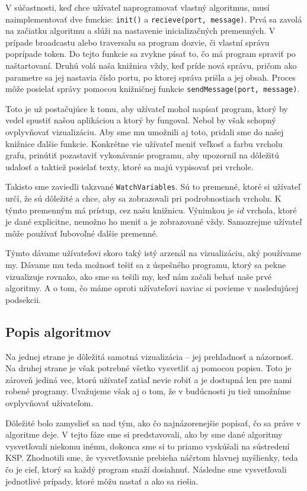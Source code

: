 V súčastnosti, keď chce užívateľ naprogramovať vlastný algoritmus, musí naimplementovať dve funckie: \verb!init()! a
\verb!recieve(port, message)!. Prvá sa zavolá na začiatku algoritmu a slúži na nastavenie
inicializačných premenných. V prípade broadcastu alebo traversalu sa program dozvie, či vlastní správu poprípade token.
Do tejto funkcie sa zvykne písať to, čo má program spraviť po naštartovaní.
Druhú volá naša knižnica vždy, keď príde nová správu, pričom ako parametre sa jej nastavia číslo
portu, po ktorej správa prišla a jej obsah. Proces môže posielať správy pomocou knižničnej
funkcie \verb!sendMessage(port, message)!.

Toto je už postačujúce k tomu, aby užívateľ mohol napísať program, ktorý by vedel spustiť našou
aplikáciou a ktorý by fungoval. Nebol by však schopný ovplyvňovať vizualizáciu. Aby sme mu umožnili
aj toto, pridali sme do našej knižnice ďalšie funkcie. Konkrétne vie užívateľ meniť veľkosť a farbu
vrcholu grafu, prinútiť pozastaviť vykonávanie programu, aby upozornil na dôležitú udalosť a
taktiež posielať texty, ktoré sa majú vypisovať pri vrchole.

Takisto sme zaviedli takzvané \verb!WatchVariables!. Sú to premenné, ktoré si užívateľ určí, že sú
dôležité a chce, aby sa zobrazovali pri podrobnostiach vrcholu. K týmto premenným má
prístup, cez našu knižnicu. Výnimkou je $id$ vrchola, ktoré je dané explicitne, nemožno ho
meniť a je zobrazované vždy. Samozrejme užívateľ môže používať ľubovoľné ďalšie premenné.

Týmto dávame užívateľovi skoro taký istý arzenál na vizualizáciu, aký používame my. Dávame mu teda
možnosť tešiť sa z úspešného programu, ktorý sa pekne vizualizuje rovnako, ako sme sa tešili my, keď
nám začali behať naše prvé algoritmy. A o tom, čo máme oproti užívateľovi naviac si povieme v
nasledujúcej podsekcii.

\subsection{Popis algoritmov}

Na jednej strane je dôležitá samotná vizualizácia -- jej prehľadnosť a názornosť. Na druhej strane
je však potrebné všetko vysvetliť aj pomocou popisu. Toto je zároveň jediná vec, ktorú užívateľ
zatiaľ nevie robiť a je dostupná len pre nami robené programy. Uvažujeme však aj o tom, že v budúcnosti
ju tiež umožníme ovplyvňovať užívateľom.

Dôležité bolo zamyslieť sa nad tým, ako čo najnázorenejšie popísať, čo sa práve v algoritme deje.
V tejto fáze sme si predstavovali, ako by sme dané algoritmy vysvetľovali niekomu inému, dokonca sme si to priamo
vyskúšali na sústredení KSP. Zhodnotili sme, že vysvetľovanie prebieha náčrtom hlavnej myšlienky,
teda čo je cieľ, ktorý sa každý program snaží dosiahnuť. Následne sme vysvetľovali jednotlivé prípady, ktoré
môžu nastať a ako sa riešia.

